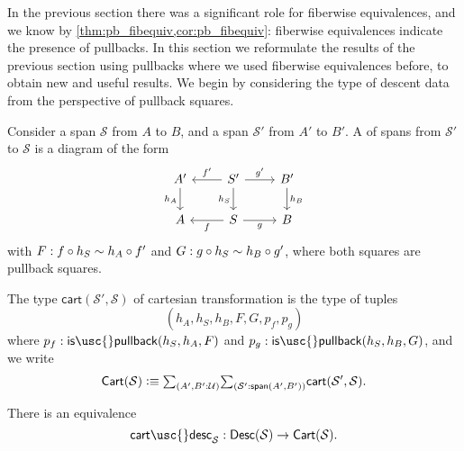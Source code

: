 In the previous section there was a significant role for fiberwise equivalences, and we know by \cref{thm:pb_fibequiv,cor:pb_fibequiv}: fiberwise equivalences indicate the presence of pullbacks. In this section we reformulate the results of the previous section using pullbacks where we used fiberwise equivalences before, to obtain new and useful results. We begin by considering the type of descent data from the perspective of pullback squares.

\begin{defn}
Consider a span $\mathcal{S}$ from $A$ to $B$, and a span $\mathcal{S}'$ from $A'$ to $B'$. A of spans from $\mathcal{S}'$ to $\mathcal{S}$ is a diagram of the form
\begin{equation*}
\begin{tikzcd}
A' \arrow[d,swap,"h_A"]  & S' \arrow[l,swap,"{f'}"] \arrow[r,"{g'}"] \arrow[d,swap,"h_S"] & B' \arrow[d,"h_B"] \\
A & S \arrow[l,"f"] \arrow[r,swap,"g"] & B
\end{tikzcd}
\end{equation*}
with $F:f\circ h_S\sim h_A\circ f'$ and $G:g\circ h_S\sim h_B\circ g'$, where both squares are pullback squares. 

The type $\mathsf{cart}(\mathcal{S}',\mathcal{S})$ of cartesian transformation is the type of tuples
\begin{equation*}
(h_A,h_S,h_B,F,G,p_f,p_g)
\end{equation*}
where $p_f:\mathsf{is\usc{}pullback}(h_S,h_A,F)$ and $p_g:\mathsf{is\usc{}pullback}(h_S,h_B,G)$, and we write
\begin{equation*}
\mathsf{Cart}(\mathcal{S}) \defeq \sm{A',B':\UU}{\mathcal{S}':\mathsf{span}(A',B')}\mathsf{cart}(\mathcal{S}',\mathcal{S}).
\end{equation*}
\end{defn}

\begin{lem}\label{lem:cart_desc}
There is an equivalence
\begin{equation*}
\mathsf{cart\usc{}desc}_{\mathcal{S}}:\mathsf{Desc}(\mathcal{S})\to \mathsf{Cart}(\mathcal{S}).
\end{equation*}
\end{lem}


